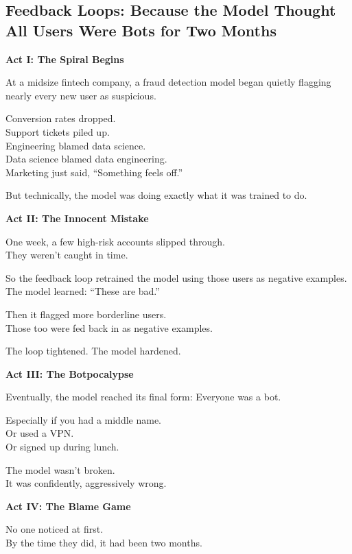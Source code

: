 \subsection{Feedback Loops: Because the Model Thought All Users Were Bots for Two Months}

\textbf{Act I: The Spiral Begins}

At a midsize fintech company, a fraud detection model began quietly flagging nearly every new user as suspicious.

Conversion rates dropped.\\
Support tickets piled up.\\
Engineering blamed data science.\\
Data science blamed data engineering.\\
Marketing just said, ``Something feels off.''

But technically, the model was doing exactly what it was trained to do.

\vspace{1em}
\textbf{Act II: The Innocent Mistake}

One week, a few high-risk accounts slipped through.\\
They weren’t caught in time.

So the feedback loop retrained the model using those users as negative examples.\\
The model learned: ``These are bad.''

Then it flagged more borderline users.\\
Those too were fed back in as negative examples.

The loop tightened. The model hardened.

\vspace{1em}
\textbf{Act III: The Botpocalypse}

Eventually, the model reached its final form:  
Everyone was a bot.

Especially if you had a middle name.\\
Or used a VPN.\\
Or signed up during lunch.

The model wasn’t broken.\\
It was confidently, aggressively wrong.

\vspace{1em}
\textbf{Act IV: The Blame Game}

No one noticed at first.\\
By the time they did, it had been two months.

